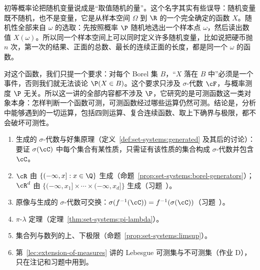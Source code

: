 \label{lec:random-variables}

初等概率论把随机变量说成是“取值随机的量”。这个名字其实有些误导：随机变量既不随机，也不是变量，它是从样本空间 $\Omega$ 到 $\R$ 的一个完全确定的函数 $X$。随机性全部来自 $\omega$ 的选取：先按照概率 $\P$ 随机地选出一个样本点 $\omega$，然后读出数值 $X(\omega)$。所以同一个样本空间上可以同时定义许多随机变量，比如说把硬币抛 $n$ 次，第一次的结果、正面的总数、最长的连续正面的长度，都是同一个 $\omega$ 的函数。

对这个函数，我们只提一个要求：对每个 Borel 集 $B$，“$X$ 落在 $B$ 中”必须是一个事件，否则我们就无法谈论 $\P(X\in B)$。这个要求只涉及 $\sigma$-代数 $\cF$，与概率测度 $\P$ 无关。所以这一讲的全部内容都不涉及 $\P$，它研究的是可测函数这一类对象本身：怎样判断一个函数可测，可测函数经过哪些运算仍然可测。结论是，分析中能够遇到的一切运算，包括四则运算、复合连续函数、取上下确界与极限，都不会破坏可测性。


\begin{enumerate}
\item 生成的 $\sigma$-代数与好集原理（定义~\ref{def:set-systems:generated} 及其后的讨论）：要证 $\sigma(\cC)$ 中每个集合有某性质，只需证有该性质的集合构成 $\sigma$-代数并包含 $\cC$。
\item $\cR$ 由 $\{(-\infty,x]:x\in\Q\}$ 生成（命题~\ref{prop:set-systems:borel-generators}）；$\cR^d$ 由 $\{(-\infty,x_1]\times\cdots\times(-\infty,x_d]\}$ 生成（习题~）。
\item 原像与生成的 $\sigma$-代数可交换：$\sigma(f^{-1}(\cC))=f^{-1}(\sigma(\cC))$（习题~）。
\item $\pi$-$\lambda$ 定理（定理~\ref{thm:set-systems:pi-lambda}）。
\item 集合列与数列的上、下极限（命题~\ref{prop:set-systems:limsup}）。
\item 第~\ref{lec:extension-of-measures} 讲的 Lebesgue 可测集与不可测集（作业 D），只在注记和习题中用到。
\end{enumerate}

